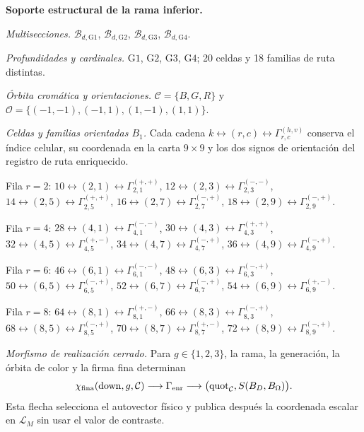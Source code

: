 \medskip
{}
\noindent\textbf{Soporte estructural de la rama inferior.}\par
\noindent\textit{Multisecciones.} \(\mathcal B_{d,\mathrm{G1}}\), \(\mathcal B_{d,\mathrm{G2}}\), \(\mathcal B_{d,\mathrm{G3}}\), \(\mathcal B_{d,\mathrm{G4}}\).\par
\noindent\textit{Profundidades y cardinales.} $\mathrm{G1}$, $\mathrm{G2}$, $\mathrm{G3}$, $\mathrm{G4}$; 20 celdas y 18 familias de ruta distintas.\par
\noindent\textit{Órbita cromática y orientaciones.} $\mathcal C=\{B,G,R\}$ y $\mathcal O=\{(-1,-1),(-1,1),(1,-1),(1,1)\}$.\par
\noindent\textit{Celdas y familias orientadas $B_1$.} Cada cadena $k\leftrightarrow(r,c)\leftrightarrow\Gamma_{r,c}^{(h,v)}$ conserva el índice celular, su coordenada en la carta $9\times9$ y los dos signos de orientación del registro de ruta enriquecido.\par
\noindent Fila $r=2$: $10\leftrightarrow(2,1)\leftrightarrow\Gamma_{2,1}^{(+,+)}$, $12\leftrightarrow(2,3)\leftrightarrow\Gamma_{2,3}^{(-,-)}$, $14\leftrightarrow(2,5)\leftrightarrow\Gamma_{2,5}^{(+,+)}$, $16\leftrightarrow(2,7)\leftrightarrow\Gamma_{2,7}^{(-,+)}$, $18\leftrightarrow(2,9)\leftrightarrow\Gamma_{2,9}^{(-,+)}$.\par
\noindent Fila $r=4$: $28\leftrightarrow(4,1)\leftrightarrow\Gamma_{4,1}^{(-,-)}$, $30\leftrightarrow(4,3)\leftrightarrow\Gamma_{4,3}^{(+,+)}$, $32\leftrightarrow(4,5)\leftrightarrow\Gamma_{4,5}^{(+,-)}$, $34\leftrightarrow(4,7)\leftrightarrow\Gamma_{4,7}^{(-,+)}$, $36\leftrightarrow(4,9)\leftrightarrow\Gamma_{4,9}^{(-,+)}$.\par
\noindent Fila $r=6$: $46\leftrightarrow(6,1)\leftrightarrow\Gamma_{6,1}^{(-,-)}$, $48\leftrightarrow(6,3)\leftrightarrow\Gamma_{6,3}^{(-,+)}$, $50\leftrightarrow(6,5)\leftrightarrow\Gamma_{6,5}^{(-,+)}$, $52\leftrightarrow(6,7)\leftrightarrow\Gamma_{6,7}^{(-,+)}$, $54\leftrightarrow(6,9)\leftrightarrow\Gamma_{6,9}^{(+,-)}$.\par
\noindent Fila $r=8$: $64\leftrightarrow(8,1)\leftrightarrow\Gamma_{8,1}^{(+,-)}$, $66\leftrightarrow(8,3)\leftrightarrow\Gamma_{8,3}^{(-,+)}$, $68\leftrightarrow(8,5)\leftrightarrow\Gamma_{8,5}^{(-,+)}$, $70\leftrightarrow(8,7)\leftrightarrow\Gamma_{8,7}^{(+,-)}$, $72\leftrightarrow(8,9)\leftrightarrow\Gamma_{8,9}^{(-,+)}$.\par
\noindent\textit{Morfismo de realización cerrado.} Para $g\in\{1,2,3\}$, la rama, la generación, la órbita de color y la firma fina determinan
\[\chi_{\rm fina}(\operatorname{down},g,\mathcal C)\longrightarrow\Gamma_{\rm enr}\longrightarrow\bigl(\operatorname{quot}_{\mathcal C},S(B_D,B_\Omega)\bigr).\]
Esta flecha selecciona el autovector físico y publica después la coordenada escalar en $\mathcal L_M$ sin usar el valor de contraste.\par
\medskip
\endgroup
